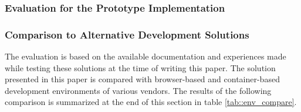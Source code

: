 \subsubsection{Evaluation for the Prototype Implementation}


\subsubsection{Comparison to Alternative Development Solutions}
The evaluation is based on the available documentation and experiences made while testing these solutions at the time of writing this paper. The solution presented in this paper is compared with browser-based and container-based development environments of various vendors. The results of the following comparison is summarized at the end of this section in table \ref{tab::env_compare}.

